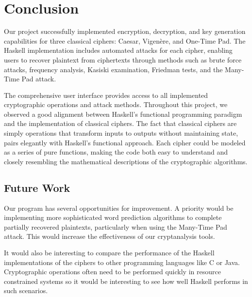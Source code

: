 
\section{Conclusion}\label{sec:Conclusion}

Our project successfully implemented encryption, decryption, and key generation capabilities for three classical ciphers: 
Caesar, Vigenère, and One-Time Pad. 
The Haskell implementation includes automated attacks for each cipher, enabling users to recover plaintext from ciphertexts through methods such as 
brute force attacks, frequency analysis, Kasiski examination, Friedman tests, and the Many-Time Pad attack.

The comprehensive user interface provides access to all implemented cryptographic operations and attack methods. 
Throughout this project, we observed a good alignment between Haskell's functional programming paradigm and the implementation of classical ciphers. 
The fact that classical ciphers are simply operations that transform inputs to outputs without maintaining state, 
pairs elegantly with Haskell's functional approach. 
Each cipher could be modeled as a series of pure functions, making the code both easy to understand 
and closely resembling the mathematical descriptions of the cryptographic algorithms.

\subsection{Future Work}
Our program has several opportunities for improvement. 
A priority would be implementing more sophisticated word prediction algorithms to complete partially recovered plaintexts, 
particularly when using the Many-Time Pad attack. This would increase the effectiveness of our cryptanalysis tools.

It would also be interesting to compare the performance of the Haskell implementations of the
ciphers to other programming languages like C or Java. Cryptographic operations often need to
be performed quickly in resource constrained systems so it would be interesting to see how well
Haskell performs in such scenarios.
